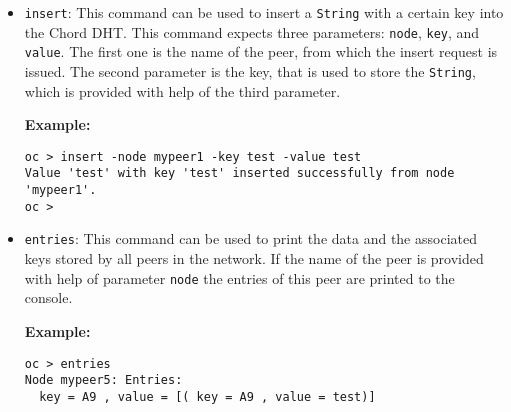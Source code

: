 \begin{itemize}
{\bf Example:}\footnote{If the examples in this section are processed in the 
same order as in this manual, their output will look similar to the examples!}
\begin{verbatim}
oc > create -names mypeer0 
Creating new chord network. 
oc > create -names mypeer1_mypeer2 -bootstraps mypeer0
Starting node with name 'mypeer1' with bootstrap node 'mypeer0'
Starting node with name 'mypeer2' with bootstrap node 'mypeer0'
oc > create -names mypeer3_mypeer4_mypeer5 -bootstraps mypeer0_mypeer1
Starting node with name 'mypeer3' with bootstrap node 'mypeer0'
Starting node with name 'mypeer4' with bootstrap node 'mypeer1'
Starting node with name 'mypeer5' with bootstrap node 'mypeer1'
oc > 
\end{verbatim}
First a new network with a single peer with name {\tt mypeer0} is created. 
Afterward two peers, that use both {\tt mypeer0} as bootstrap node are simultaneously 
created. Then three peers are created. The first one uses {\tt mypeer0} as bootstrap 
peer and the last two use {\tt mypeer1} as bootstrap peer. Bootstrap peers from 
the list are assigned to the peers at the same position of the list of peers to create. 
If there are fewer bootstrap peers than peers to create, the last bootstrap peer 
of the bootstrap peer list is assigned to all peers at the end of the list as a 
bootstrap peer. 
%
\item {\tt insert}: This command can be used to insert a {\tt String} with a 
certain key into the Chord DHT. This command expects three parameters: {\tt node}, 
{\tt key}, and {\tt value}. The first one is the name of the peer, from which the 
insert request is issued. The second parameter is the key, that is used to store 
the {\tt String}, which is provided with help of the third parameter. 

{\bf Example:}
\begin{verbatim}
oc > insert -node mypeer1 -key test -value test
Value 'test' with key 'test' inserted successfully from node 'mypeer1'.
oc >
\end{verbatim}
%
\item {\tt entries}: This command can be used to print the data and the associated 
keys stored by all peers in the network. If the name of the peer is provided with 
help of parameter {\tt node} the entries of this peer are printed to the console. 

{\bf Example:}
\begin{verbatim}
oc > entries
Node mypeer5: Entries:
  key = A9 , value = [( key = A9 , value = test)]


\end{verbatim}
\end{itemize}
